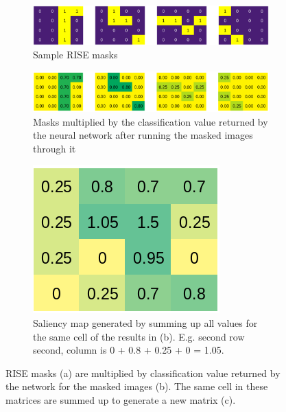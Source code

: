 \begin{figure}[H]
    \centering
    \begin{subfigure}[t]{\textwidth}
        \centering
        \includegraphics[width=\linewidth]{chapters/02_methods/images/rise/explain_rise_masks.png}
        \caption{Sample RISE masks}
    \end{subfigure}
    \begin{subfigure}[t]{\textwidth}
        \centering
        \includegraphics[width=\linewidth]{chapters/02_methods/images/rise/explain_rise_result.png}
        \caption{Masks multiplied by the classification value returned by the neural network after running the masked images through it}
    \end{subfigure}\hfill
    \begin{subfigure}[t]{.5\textwidth}
        \centering
        \includegraphics[width=\linewidth]{chapters/02_methods/images/rise/explain_rise_saliency.png}
        \caption{Saliency map generated by summing up all values for the same cell of the results in (b). E.g. second row second, column is 0 + 0.8  + 0.25 + 0 = 1.05.}
    \end{subfigure}
    \caption{RISE masks (a) are multiplied by classification value returned by the network for the masked images (b). The same cell in these matrices are summed up to generate a new matrix (c).}
    \label{rise_explanation}
\end{figure}

